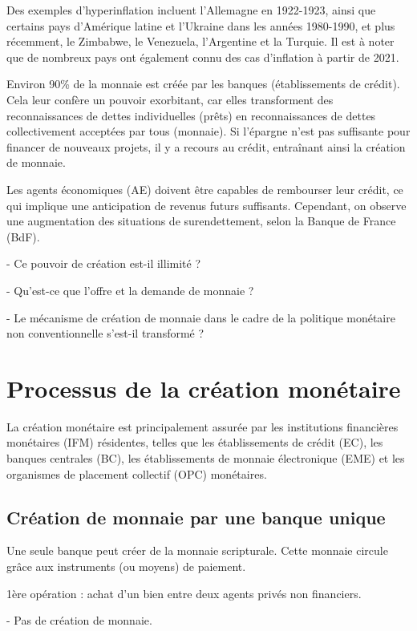 \documentclass[a4paper, 12pt]{report}
\begin{document}
Des exemples d'hyperinflation incluent l'Allemagne en 1922-1923, ainsi que certains pays d'Amérique latine et l'Ukraine dans les années 1980-1990, et plus récemment, le Zimbabwe, le Venezuela, l'Argentine et la Turquie. Il est à noter que de nombreux pays ont également connu des cas d'inflation à partir de 2021.

Environ 90\% de la monnaie est créée par les banques (établissements de crédit). Cela leur confère un pouvoir exorbitant, car elles transforment des reconnaissances de dettes individuelles (prêts) en reconnaissances de dettes collectivement acceptées par tous (monnaie). Si l'épargne n'est pas suffisante pour financer de nouveaux projets, il y a recours au crédit, entraînant ainsi la création de monnaie. 

Les agents économiques (AE) doivent être capables de rembourser leur crédit, ce qui implique une anticipation de revenus futurs suffisants. Cependant, on observe une augmentation des situations de surendettement, selon la Banque de France (BdF).


- Ce pouvoir de création est-il illimité ? 

- Qu'est-ce que l'offre et la demande de monnaie ?

- Le mécanisme de création de monnaie dans le cadre de la politique monétaire non conventionnelle s'est-il transformé ?

\section{Processus de la création monétaire}

La création monétaire est principalement assurée par les institutions financières monétaires (IFM) résidentes, telles que les établissements de crédit (EC), les banques centrales (BC), les établissements de monnaie électronique (EME) et les organismes de placement collectif (OPC) monétaires.

\subsection{Création de monnaie par une banque unique}
	
Une seule banque peut créer de la monnaie scripturale. Cette monnaie circule grâce aux instruments (ou moyens) de paiement.
	
1ère opération : achat d'un bien entre deux agents privés non financiers.  

- Pas de création de monnaie.
\end{document}
